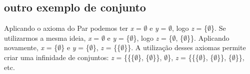 \subsection{outro exemplo de conjunto}
Aplicando o axioma do Par podemos ter  \textit{x} = $\emptyset$ e \textit{y} = $\emptyset$, logo \textit{z} = \{$\emptyset$\}.
\newline
Se utilizarmos a mesma ideia, \textit{x} = $\emptyset$ e \textit{y} = \{$\emptyset$\}, logo \textit{z} = \{$\emptyset$, \{$\emptyset$\}\}. \newline
Aplicando novamente,  \textit{x} = \{$\emptyset$\} e \textit{y} = \{$\emptyset$\}, \textit{z} = \{\{$\emptyset$\}\}. \newline
A utilização desses axiomas permite criar uma infinidade de conjuntos: \newline\textit{z} = \{\{\{$\emptyset$\}, \{$\emptyset$\}\}, $\emptyset$\}, \textit{z} = \{\{\{$\emptyset$\}, \{$\emptyset$\}\}, \{$\emptyset$\}\}, etc.

